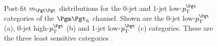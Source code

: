 \begin{figure}[tbh]


\caption[Post-fit $m_{\Pgt\Pgt}$ distributions for the 0-jet and 1-jet low-$\pt^{\Pgt}$ 
categories of the $\mutau$ channel.]{Post-fit $m_{\Pgt\Pgt}$ distributions for
the 0-jet and 1-jet low-$\pt^{\Pgt}$ categories of the $\mutau$ channel. Shown are the 0-jet
low-$\pt^{\Pgt}$ (a), 0-jet high-$\pt^{\Pgt}$ (b) and 1-jet
low-$\pt^{\Pgt}$ (c) categories. These are the three least sensitive categories \cite{HIG-13-004}.}
\label{fig:postfit0jet1jetmutau}
\end{figure}

